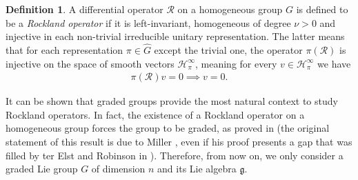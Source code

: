 \documentclass[12pt,oneside,a4paper]{book}
\numberwithin{equation}{section}     %
\theoremstyle{plain}
\theoremstyle{definition}
\newtheorem{definition}[theorem]{Definition}
\begin{document}
\begin{definition}\label{rockland}
	A differential operator  $\mathcal R$ on a homogeneous group $G$ is defined to be a \textit{Rockland operator} if it is left-invariant, homogeneous of degree $\nu>0$ and injective in each non-trivial irreducible unitary representation. The latter means that for each representation $\pi\in\widehat G$ except the trivial one, the operator $\pi(\mathcal R)$ is injective on the space of smooth vectors $\mathcal H^\infty_\pi$, meaning for every $v\in\mathcal H^\infty_\pi$ we have
	\begin{align}\label{Rockland}
	\pi(\mathcal R)v=0\implies v=0.
	\end{align}
\end{definition}
It can be shown that graded groups provide the most natural context to study Rockland operators. In fact, the existence of a Rockland operator on a homogeneous group forces the group to be graded, as proved in \cite[Proposition 4.1.3.]{FR2016} (the original statement of this result is due to Miller \cite{Miller:80}, even if his proof presents a gap that was filled by ter Elst and Robinson in \cite{tER:97}). Therefore, from now on, we only consider a graded Lie group $G$ of dimension $n$ and its Lie algebra $\mathfrak{g}$. 
\end{document}
